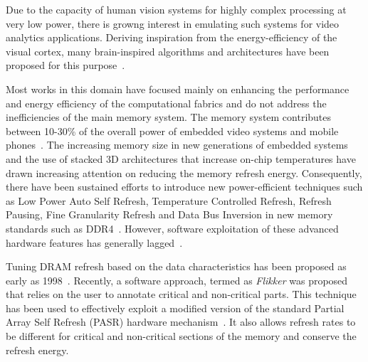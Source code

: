 
Due to the capacity of human vision systems for highly complex processing at very low power, there is growng interest in emulating such systems for video analytics applications.
Deriving inspiration from the energy-efficiency of the visual cortex, many brain-inspired algorithms and architectures have been proposed for this purpose~\cite{Nere2011,Chen2014,Kestur2012}. %



Most works in this domain have focused mainly on enhancing the performance and energy efficiency of the computational fabrics and do not address the inefficiencies of the main memory system. The memory system contributes between 10-30\% of the overall power of embedded video systems and mobile phones~\cite{CarrollAaronHeiser2010}. 
The increasing memory size in new generations of embedded systems and the use of stacked 3D architectures that increase on-chip temperatures have drawn increasing attention on reducing the memory refresh energy. Consequently, there have been sustained efforts to introduce new power-efficient techniques such as Low Power Auto Self Refresh, Temperature Controlled Refresh, Refresh Pausing, Fine Granularity Refresh and Data Bus Inversion in new memory standards such as DDR4~\cite{jedec-sdram-standards}.  However, software exploitation of these advanced hardware features has generally lagged~\cite{Mukundan2013,refresh-pausing-taco2014}. 

Tuning DRAM refresh based on the data characteristics has been proposed as early as 1998~\cite{islped98}. Recently, a software approach, termed as \emph{Flikker} was proposed that relies on the user to annotate critical and non-critical parts. This technique has been used to effectively exploit a modified version of the standard Partial Array Self Refresh (PASR) hardware mechanism~\cite{Liu2011}. It also allows refresh rates to be different for critical and non-critical sections of the memory and conserve the refresh energy. 

